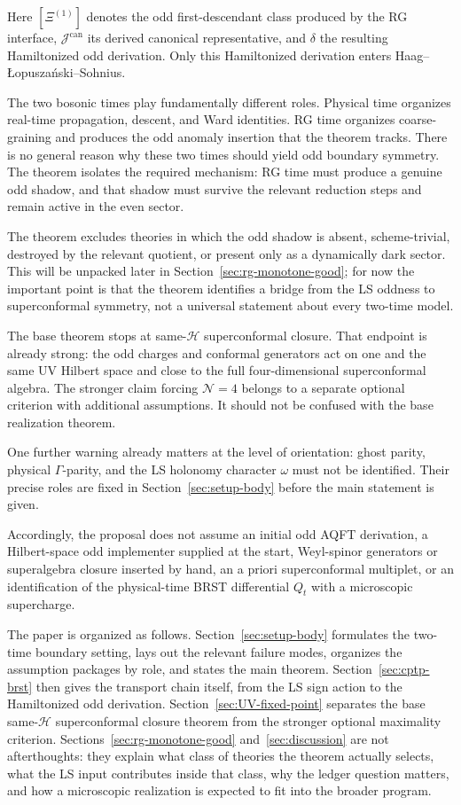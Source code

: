 \documentclass[
  aps,
  prd,
  onecolumn,
  notitlepage,
  nofootinbib,
  superscriptaddress,
  10pt
]{revtex4-2}
\theoremstyle{definition}
\theoremstyle{plain}
\begin{document}
Here \([\Xi^{(1)}]\) denotes the odd first-descendant class produced by the RG
interface, \(\mathcal J^{\mathrm{can}}\) its derived canonical
representative, and \(\delta\) the resulting Hamiltonized odd derivation.  Only
this Hamiltonized derivation enters Haag--\L opusza\'nski--Sohnius.

The two bosonic times play fundamentally different roles.  Physical time
organizes real-time propagation, descent, and Ward identities.  RG time
organizes coarse-graining and produces the odd anomaly insertion that the
theorem tracks.  There is no general reason why these two times should yield
odd boundary symmetry.  The theorem isolates the required mechanism: RG time
must produce a genuine odd shadow, and that shadow must survive the relevant
reduction steps and remain active in the even sector.

The theorem excludes theories in which the odd shadow is absent, scheme-trivial, destroyed by the
relevant quotient, or present only as a dynamically dark sector.  This will be
unpacked later in Section~\ref{sec:rg-monotone-good}; for now the important
point is that the theorem identifies a bridge from the LS oddness to
superconformal symmetry, not a universal statement about every two-time model.

The base theorem stops at same-\(\mathcal H\) superconformal closure.  That
endpoint is already strong: the odd charges and conformal generators act on one
and the same UV Hilbert space and close to the full four-dimensional
superconformal algebra.  The stronger claim forcing \(\mathcal N=4\) belongs to
a separate optional criterion with additional assumptions.  It should not be
confused with the base realization theorem.

One further warning already matters at the level of orientation: ghost parity,
physical \(\Gamma\)-parity, and the LS holonomy character \(\omega\) must not be
identified.  Their precise roles are fixed in Section~\ref{sec:setup-body}
before the main statement is given.

Accordingly, the proposal does not assume an initial odd AQFT derivation, a
Hilbert-space odd implementer supplied at the start, Weyl-spinor generators or
superalgebra closure inserted by hand, an a priori superconformal multiplet, or
an identification of the physical-time BRST differential \(Q_t\) with a
microscopic supercharge.

The paper is organized as follows.  Section~\ref{sec:setup-body} formulates the
two-time boundary setting, lays out the relevant failure modes, organizes the
assumption packages by role, and states the main theorem.  Section~\ref{sec:cptp-brst}
then gives the transport chain itself, from the LS sign action to the
Hamiltonized odd derivation.  Section~\ref{sec:UV-fixed-point} separates the
base same-\(\mathcal H\) superconformal closure theorem from the stronger
optional maximality criterion.  Sections~\ref{sec:rg-monotone-good}
and~\ref{sec:discussion} are not afterthoughts: they explain what class of
theories the theorem actually selects, what the LS input contributes inside
that class, why the ledger question matters, and how a microscopic
realization is expected to fit into the broader program.
\end{document}
